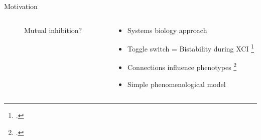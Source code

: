 \documentclass[aspectratio=169,9pt]{beamer}
\begin{document}
    \begin{frame}{Motivation}
        \begin{columns}
            \begin{column}{0.33\textwidth}
                    \begin{figure}
                        \centering
                        \caption{Mutual inhibition?}
                    \end{figure}
                \end{column}
                \begin{column}{0.6\textwidth}
                    \begin{itemize}
                        \item Systems biology approach
                        \item Toggle switch = Bistability during XCI \footcite{XCI-TS}
                        \item Connections influence phenotypes \footcite{topo}
                        \item Simple phenomenological model
                    \end{itemize}
                \end{column}
            \end{columns}
    \end{frame}
\end{document}

